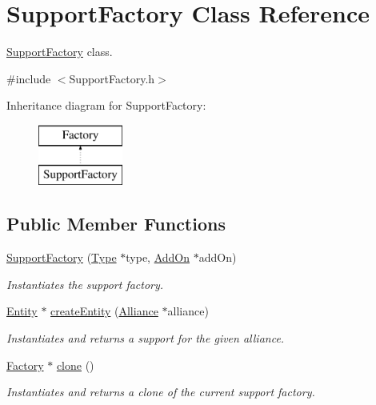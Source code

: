 \hypertarget{classSupportFactory}{}\section{Support\+Factory Class Reference}
\label{classSupportFactory}


\hyperlink{classSupportFactory}{Support\+Factory} class.  




{\ttfamily \#include $<$Support\+Factory.\+h$>$}

Inheritance diagram for Support\+Factory\+:\begin{figure}[H]
\begin{center}
\leavevmode
\includegraphics[height=2.000000cm]{classSupportFactory}
\end{center}
\end{figure}
\subsection*{Public Member Functions}
\begin{DoxyCompactItemize}
\item 
\hyperlink{classSupportFactory_a8e0b10fb625f7d4a93cec9989bef45c4}{Support\+Factory} (\hyperlink{classType}{Type} $\ast$type, \hyperlink{classAddOn}{Add\+On} $\ast$add\+On)
\begin{DoxyCompactList}\small\item\em Instantiates the support factory. \end{DoxyCompactList}\item 
\hyperlink{classEntity}{Entity} $\ast$ \hyperlink{classSupportFactory_ad2ebc8fdf1335e423a766fa0c5573cf8}{create\+Entity} (\hyperlink{classAlliance}{Alliance} $\ast$alliance)
\begin{DoxyCompactList}\small\item\em Instantiates and returns a support for the given alliance. \end{DoxyCompactList}\item 
\hyperlink{classFactory}{Factory} $\ast$ \hyperlink{classSupportFactory_a802c25e901b479656ea95a5678a1ad26}{clone} ()
\begin{DoxyCompactList}\small\item\em Instantiates and returns a clone of the current support factory. \end{DoxyCompactList}\end{DoxyCompactItemize}


